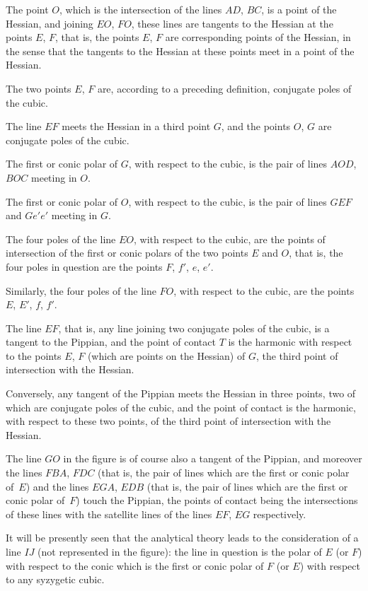 \documentclass[12pt,a4paper]{article}
\theoremstyle{definition}
\begin{document}
The point $O$, which is the intersection of the lines $AD$, $BC$,
is a point of the Hessian, and joining $EO$, $FO$, these lines
are tangents to the Hessian at the points $E$, $F$, that is, the
points $E$, $F$ are corresponding points of the Hessian, in the
sense that the tangents to the Hessian at these points meet
in a point of the Hessian.

The two points $E$, $F$ are, according to a preceding definition,
conjugate poles of the cubic.

The line $EF$ meets the Hessian in a third point $G$, and the
points $O$, $G$ are conjugate poles of the cubic.

The first or conic polar of $G$, with respect to the cubic, is
the pair of lines $AOD$, $BOC$ meeting in $O$.

The first or conic polar of $O$, with respect to the cubic, is
the pair of lines $GEF$ and $Ge'e'$ meeting in $G$.

The four poles of the line $EO$, with respect to the cubic, are
the points of intersection of the first or conic polars of the two
points $E$ and $O$, that is, the four poles in question are the
points $F$, $f'$, $e$, $e'$.

Similarly, the four poles of the line $FO$, with respect to the
cubic, are the points $E$, $E'$, $f$, $f'$.

The line $EF$, that is, any line joining two conjugate poles
of the cubic, is a tangent to the Pippian, and the point of
contact $T$ is the harmonic with respect to the points $E$, $F$
(which are points on the Hessian) of $G$, the third point of
intersection with the Hessian.

Conversely, any tangent of the Pippian meets the Hessian
in three points, two of which are conjugate poles of the cubic,
and the point of contact is the harmonic, with respect to these
two points, of the third point of intersection with the Hessian.

The line $GO$ in the figure is of course also a tangent of the
Pippian, and moreover the lines $FBA$, $FDC$ (that is, the pair
of lines which are the first or conic polar of~$E$) and the lines
$EGA$, $EDB$ (that is, the pair of lines which are the first or
conic polar of~$F$) touch the Pippian, the points of contact
being the intersections of these lines with the satellite lines
of the lines $EF$, $EG$ respectively.

It will be presently seen that the analytical theory leads to
the consideration of a line $IJ$ (not represented in the figure):
the line in question is the polar of $E$ (or $F$) with respect to
the conic which is the first or conic polar of $F$ (or $E$) with
respect to any syzygetic cubic.
\end{document}
